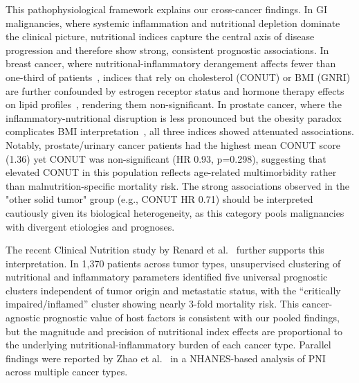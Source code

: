 \documentclass[review]{elsarticle}
\begin{document}
This pathophysiological framework explains our cross-cancer findings. In GI malignancies, where systemic inflammation and nutritional depletion dominate the clinical picture, nutritional indices capture the central axis of disease progression and therefore show strong, consistent prognostic associations. In breast cancer, where nutritional-inflammatory derangement affects fewer than one-third of patients~\cite{poisson2021}, indices that rely on cholesterol (CONUT) or BMI (GNRI) are further confounded by estrogen receptor status and hormone therapy effects on lipid profiles~\cite{nelson2014}, rendering them non-significant. In prostate cancer, where the inflammatory-nutritional disruption is less pronounced but the obesity paradox complicates BMI interpretation~\cite{lopez2022}, all three indices showed attenuated associations. Notably, prostate/urinary cancer patients had the highest mean CONUT score (1.36) yet CONUT was non-significant (HR 0.93, p=0.298), suggesting that elevated CONUT in this population reflects age-related multimorbidity rather than malnutrition-specific mortality risk. The strong associations observed in the "other solid tumor" group (e.g., CONUT HR 0.71) should be interpreted cautiously given its biological heterogeneity, as this category pools malignancies with divergent etiologies and prognoses.

The recent Clinical Nutrition study by Renard et al.~\cite{renard2025} further supports this interpretation. In 1,370 patients across tumor types, unsupervised clustering of nutritional and inflammatory parameters identified five universal prognostic clusters independent of tumor origin and metastatic status, with the ``critically impaired/inflamed'' cluster showing nearly 3-fold mortality risk. This cancer-agnostic prognostic value of host factors is consistent with our pooled findings, but the magnitude and precision of nutritional index effects are proportional to the underlying nutritional-inflammatory burden of each cancer type. Parallel findings were reported by Zhao et al.~\cite{zhao2024} in a NHANES-based analysis of PNI across multiple cancer types.
\end{document}
